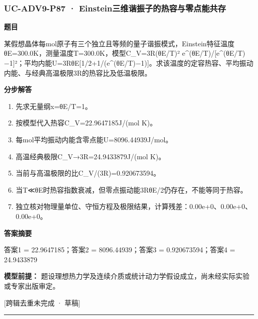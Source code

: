 \documentclass[UTF8,11pt,a4paper]{ctexart}
\begin{document}
\subsubsection*{UC-ADV9-P87 · Einstein三维谐振子的热容与零点能共存}
\noindent\textbf{题目}\par
某假想晶体每mol原子有三个独立且等频的量子谐振模式，Einstein特征温度θE=300.0K，测量温度T=300.0K，模型C\_V=3R(θE/T)² e\textasciicircum{}(θE/T)/[e\textasciicircum{}(θE/T)−1]²；平均内能U=3RθE[1/2+1/(e\textasciicircum{}(θE/T)−1)]。求该温度的定容热容、平均振动内能、与经典高温极限3R的热容比及低温极限。\par
\medskip\noindent\textbf{分步解答}
\begin{enumerate}
\item 先求无量纲x=θE/T=1。
\item 按模型代入热容C\_V=22.9647185J/(mol K)。
\item 每mol平均振动内能含零点能U=8096.44939J/mol。
\item 高温经典极限C\_V→3R=24.9433879J/(mol K)。
\item 当前与高温极限的比C\_V/(3R)=0.920673594。
\item 当T≪θE时热容指数衰减，但零点振动能3RθE/2仍存在，不能等同于热容。
\item 独立核对物理量单位、守恒方程及极限结果，计算残差：0.00e+0、0.00e+0、0.00e+0。
\end{enumerate}
\noindent\textbf{答案摘要}\par
答案1 = 22.9647185；答案2 = 8096.44939；答案3 = 0.920673594；答案4 = 24.9433879\par
\noindent\textbf{模型前提：}
题设理想热力学及连续介质或统计动力学假设成立，尚未经实际实验或专家出版审定。\par
\noindent\textcolor{red!65!black}{[跨辑去重未完成 · 草稿]} \par
\medskip\hrule\medskip
{}
\end{document}
